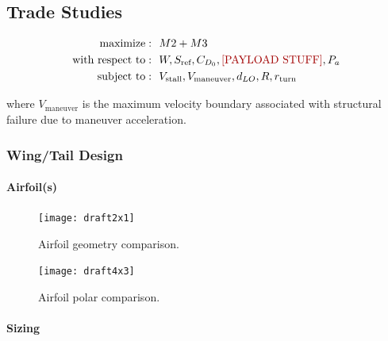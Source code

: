 \documentclass[report]{byu-aero}
\begin{document}
\subsection{Trade Studies}
\label{ssec:tradestudies}

\begin{equation}
	\label{eqn:optdef}
	\begin{aligned}
		\text{maximize}: 
		& ~~M2 + M3 \\
		\text{with respect to}:
		& ~~W, S_\text{ref}, C_{D_0}, \text{\color{\BYUred} [PAYLOAD STUFF]}, P_a \\
		\text{subject to}: 
		& ~~V_\text{stall}, V_\text{maneuver}, d_{LO}, R, r_\text{turn}
	\end{aligned}
\end{equation}

where \(V_\text{maneuver}\) is the maximum velocity boundary associated with structural failure due to maneuver acceleration.


\subsubsection{Wing/Tail Design}

\paragraph{Airfoil(s)}

\begin{figure}[h!]
	\centering
	\texttt{[image: draft2x1]}
	\caption{Airfoil geometry comparison.}
	\label{fig:airfoilgeometrycomp}
\end{figure}

\begin{figure}[h!]
	\centering
	\texttt{[image: draft4x3]}
	\caption{Airfoil polar comparison.}
	\label{fig:airfoilpolarcomp}
\end{figure}


\paragraph{Sizing}
\end{document}
